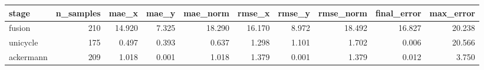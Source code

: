 \begin{tabular}{lrrrrrrrrr}
\hline
stage & n\_samples & mae\_x & mae\_y & mae\_norm & rmse\_x & rmse\_y & rmse\_norm & final\_error & max\_error \\
\hline
fusion & 210 & 14.920 & 7.325 & 18.290 & 16.170 & 8.972 & 18.492 & 16.827 & 20.238 \\
unicycle & 175 & 0.497 & 0.393 & 0.637 & 1.298 & 1.101 & 1.702 & 0.006 & 20.566 \\
ackermann & 209 & 1.018 & 0.001 & 1.018 & 1.379 & 0.001 & 1.379 & 0.012 & 3.750 \\
\hline
\end{tabular}